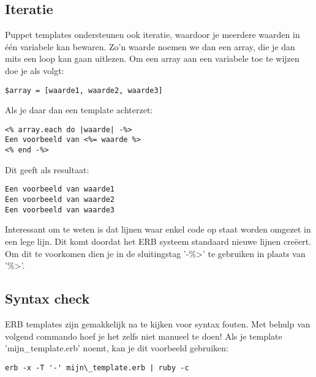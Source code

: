 \subsection{Iteratie}
Puppet templates ondersteunen ook iteratie, waardoor je meerdere waarden in \'{e}\'{e}n variabele kan bewaren. Zo'n waarde noemen we dan een array, die je dan mits een loop kan gaan uitlezen. Om een array aan een variabele toe te wijzen doe je als volgt:
%
\begin{code}
\begin{lstlisting}
$array = [waarde1, waarde2, waarde3]
\end{lstlisting}
\end{code}
%
Als je daar dan een template achterzet:
%
\begin{code}
\begin{lstlisting}
<% array.each do |waarde| -%>
Een voorbeeld van <%= waarde %>
<% end -%>
\end{lstlisting}
\end{code}
%
Dit geeft als resultaat:
%
\begin{code}
\begin{lstlisting}
Een voorbeeld van waarde1
Een voorbeeld van waarde2
Een voorbeeld van waarde3
\end{lstlisting}
\end{code}
%
Interessant om te weten is dat lijnen waar enkel code op staat worden omgezet in een lege lijn. Dit komt doordat het ERB systeem standaard nieuwe lijnen cre\"{e}ert. Om dit te voorkomen dien je in de sluitingstag '-\%>' te gebruiken in plaats van '\%>'.
%
\subsection{Syntax check}
ERB templates zijn gemakkelijk na te kijken voor syntax fouten. Met behulp van volgend commando hoef je het zelfs niet manueel te doen! Als je template 'mijn\_template.erb' noemt, kan je dit voorbeeld gebruiken:
%
\begin{code}
\begin{lstlisting}
erb -x -T '-' mijn\_template.erb | ruby -c
\end{lstlisting}
\end{code}
